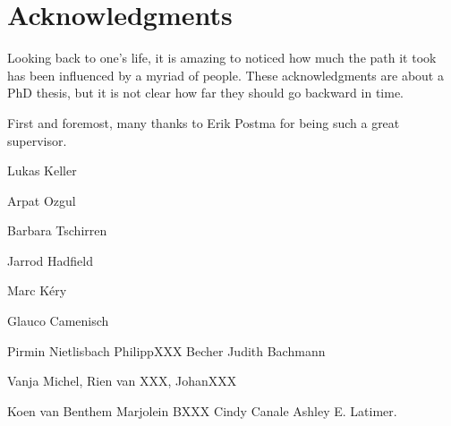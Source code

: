 \chapter{Acknowledgments}

Looking back to one's life, it is amazing to noticed how much the path it took has been influenced by a myriad of people. These acknowledgments are about a PhD thesis, but it is not clear how far they should go backward in time.

First and foremost, many thanks to Erik Postma for being such a great supervisor. 

Lukas Keller

Arpat Ozgul

Barbara Tschirren

Jarrod Hadfield

Marc K\'{e}ry


Glauco Camenisch

Pirmin Nietlisbach
PhilippXXX Becher
Judith Bachmann

Vanja Michel, Rien van XXX, JohanXXX

Koen van Benthem
Marjolein BXXX
Cindy Canale
Ashley E. Latimer.

